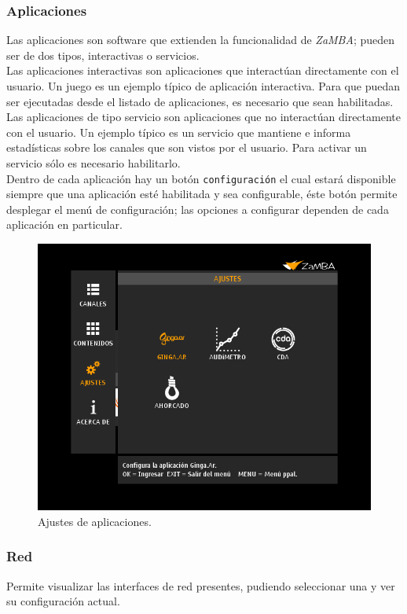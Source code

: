 \documentclass{article}
\begin{document}
\subsubsection{Aplicaciones}
	Las aplicaciones son software que extienden la funcionalidad de \emph{ZaMBA}; pueden ser de dos tipos, interactivas o servicios.\\
Las aplicaciones interactivas son aplicaciones que interactúan directamente con el usuario. Un juego es un ejemplo típico de aplicación interactiva. Para que puedan ser ejecutadas desde el listado de aplicaciones, es necesario que sean habilitadas.\\
Las aplicaciones de tipo servicio son aplicaciones que no interactúan directamente con el usuario. Un ejemplo típico es un servicio que mantiene e informa estadísticas sobre los canales que son vistos por el usuario. Para activar un servicio sólo es necesario habilitarlo.\\
Dentro de cada aplicación hay un botón \texttt{configuración} el cual estará disponible siempre que una aplicación esté habilitada y sea configurable, éste botón permite desplegar el menú de configuración; las opciones a configurar dependen de cada aplicación en particular.\\

	\begin{figure}[h]
		\centerline{\includegraphics[scale=0.50,keepaspectratio=true]{ajustes_apps}}
		\caption{Ajustes de aplicaciones.}
	\end{figure}
	
\subsubsection{Red}
	Permite visualizar las interfaces de red presentes, pudiendo seleccionar una y ver su configuración actual.
	
\end{document}
